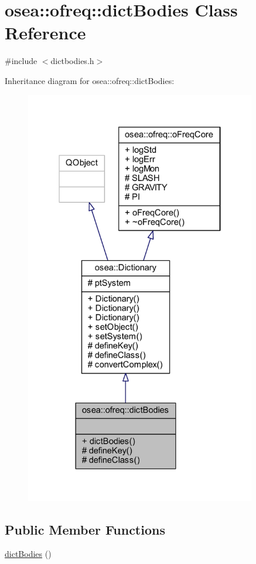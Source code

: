 \hypertarget{classosea_1_1ofreq_1_1dict_bodies}{\section{osea\-:\-:ofreq\-:\-:dict\-Bodies Class Reference}
\label{classosea_1_1ofreq_1_1dict_bodies}
}


{\ttfamily \#include $<$dictbodies.\-h$>$}



Inheritance diagram for osea\-:\-:ofreq\-:\-:dict\-Bodies\-:
\nopagebreak
\begin{figure}[H]
\begin{center}
\leavevmode
\includegraphics[width=286pt]{classosea_1_1ofreq_1_1dict_bodies__inherit__graph}
\end{center}
\end{figure}
\subsection*{Public Member Functions}
\begin{DoxyCompactItemize}
\item 
\hyperlink{classosea_1_1ofreq_1_1dict_bodies_af8245ee07739bfa399051cbb5aac7f9d}{dict\-Bodies} ()
\end{DoxyCompactItemize}
